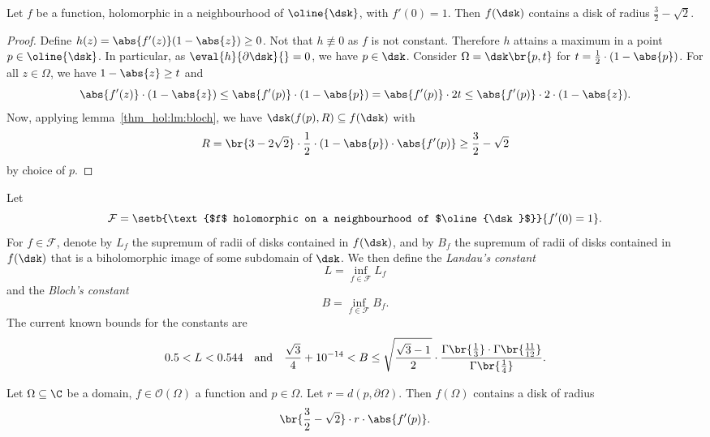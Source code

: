 \begin{izrek}[Bloch]
Let $f$ be a function, holomorphic in a neighbourhood of
$\oline{\dsk}$, with $f'(0) = 1$. Then $f(\dsk)$ contains a disk of
radius $\frac{3}{2} - \sqrt{2}$.
\end{izrek}


\begin{proof}
Define $h(z) = \abs{f'(z)} (1-\abs{z}) \geq 0$. Not that
$h \not \equiv 0$ as $f$ is not constant. Therefore $h$ attains a
maximum in a point $p \in \oline{\dsk}$. In particular, as
$\eval{h}{\partial \dsk}{} = 0$, we have $p \in \dsk$. Consider
$\Omega = \dsk \br{p, t}$ for
$t = \frac{1}{2} \cdot (1 - \abs{p})$.
For all $z \in \Omega$, we have $1 - \abs{z} \geq t$ and
\[
\abs{f'(z)} \cdot (1 - \abs{z}) \leq
\abs{f'(p)} \cdot (1 - \abs{p}) =
\abs{f'(p)} \cdot 2t \leq
\abs{f'(p)} \cdot 2 \cdot (1 - \abs{z}).
\]
Now, applying lemma~\ref{thm_hol:lm:bloch}, we have
$\dsk(f(p), R) \subseteq f(\dsk)$ with
\[
R =
\br{3 - 2 \sqrt{2}} \cdot \frac{1}{2}
\cdot (1 - \abs{p}) \cdot \abs{f'(p)} \geq
\frac{3}{2} - \sqrt{2}
\]
by choice of $p$.
\end{proof}

\begin{opomba}
Let
\[
\mathcal{F} =
\setb{\text{$f$ holomorphic on a neighbourhood of $\oline{\dsk}$}}
{f'(0) = 1}.
\]
For $f \in \mathcal{F}$, denote by $L_f$ the supremum of radii of
disks contained in $f(\dsk)$, and by $B_f$ the supremum of radii of
disks contained in $f(\dsk)$ that is a biholomorphic image of some
subdomain of $\dsk$. We then define the \emph{Landau's constant}
\[
L = \inf_{f \in \mathcal{F}} L_f
\]
and the \emph{Bloch's constant}
\[
B = \inf_{f \in \mathcal{F}} B_f.
\]
The current known bounds for the constants are
\[
0.5 < L < 0.544
\quad \text{and} \quad
\frac{\sqrt{3}}{4} + 10^{-14} < B \leq
\sqrt{\frac{\sqrt{3} - 1}{2}} \cdot
\frac{\Gamma \br{\frac{1}{3}} \cdot \Gamma \br{\frac{11}{12}}}
{\Gamma \br{\frac{1}{4}}}.
\]
\end{opomba}

\begin{posledica}
\label{thm_hol:cor:bloch}
Let $\Omega \subseteq \C$ be a domain, $f \in \mathcal{O}(\Omega)$
a function and $p \in \Omega$. Let $r = d(p, \partial \Omega)$.
Then $f(\Omega)$ contains a disk of radius
\[
\br{\frac{3}{2} - \sqrt{2}} \cdot r \cdot \abs{f'(p)}.
\]
\end{posledica}

\obvs

